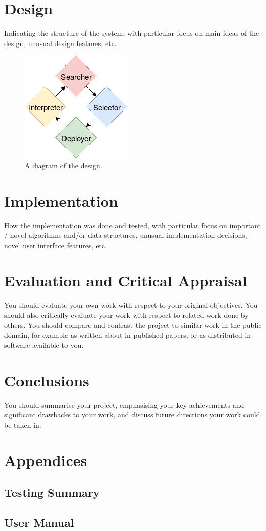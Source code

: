 \documentclass{article}
\begin{document}
\section{Design}
Indicating the structure of the system, with particular
focus on main ideas of the design, unusual design
features, etc. \\
\begin{figure}[!hb]
  \caption{A diagram of the design.}
  \centering
   \includegraphics[scale=0.8]{Design}
\end{figure}
\section{Implementation}
How the implementation was done and tested, with
particular focus on important / novel algorithms and/or
data structures, unusual implementation decisions, novel
user interface features, etc.
\section{Evaluation and Critical Appraisal}
You should evaluate your own work with respect to your
original objectives. You should also critically evaluate
your work with respect to related work done by others.
You should compare and contrast the project to similar
work in the public domain, for example as written about
in published papers, or as distributed in software available to you. 
\section{Conclusions}
You should summarise your project, emphasising your
key achievements and significant drawbacks to your
work, and discuss future directions your work could be
taken in.
\newpage


\newpage
\section*{Appendices}
\subsection*{Testing Summary}
\subsection*{User Manual}
\end{document}
